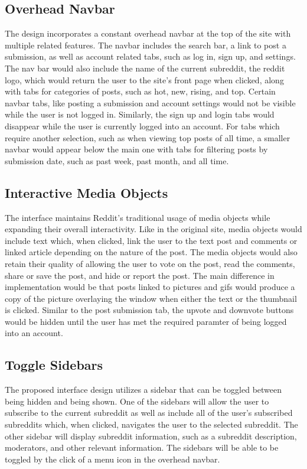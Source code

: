 \documentclass{article}
\begin{document}
\subsection{Overhead Navbar} The design incorporates a constant overhead navbar at the top of the site with multiple related features. The navbar includes the search bar, a link to post a submission, as well as account related tabs, such as log in, sign up, and settings. The nav bar would also include the name of the current subreddit, the reddit logo, which would return the user to the site's front page when clicked, along with tabs for categories of posts, such as hot, new, rising, and top. Certain navbar tabs, like posting a submission and account settings would not be visible while the user is not logged in. Similarly, the sign up and login tabs would disappear while the user is currently logged into an account. For tabs which require another selection, such as when viewing top posts of all time, a smaller navbar would appear below the main one with tabs for filtering posts by submission date, such as past week, past month, and all time.

\subsection{Interactive Media Objects} The interface maintains Reddit's traditional usage of media objects while expanding their overall interactivity. Like in the original site, media objects would include text which, when clicked, link the user to the text post and comments or linked article depending on the nature of the post. The media objects would also retain their quality of allowing the user to vote on the post, read the comments, share or save the post, and hide or report the post. The main difference in implementation would be that posts linked to pictures and gifs would produce a copy of the picture overlaying the window when either the text or the thumbnail is clicked. Similar to the post submission tab, the upvote and downvote buttons would be hidden until the user has met the required paramter of being logged into an account.

\subsection{Toggle Sidebars} The proposed interface design utilizes a sidebar that can be toggled between being hidden and being shown. One of the sidebars will allow the user to subscribe to the current subreddit as well as include all of the user's subscribed subreddits which, when clicked, navigates the user to the selected subreddit. The other sidebar will display subreddit information, such as a subreddit description, moderators, and other relevant information. The sidebars will be able to be toggled by the click of a menu icon in the overhead navbar.
\end{document}
